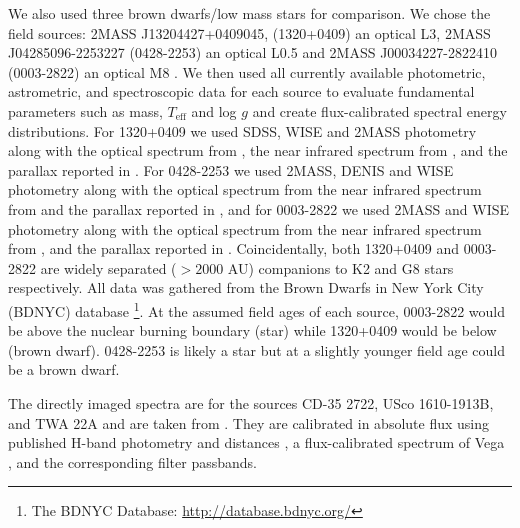 \documentclass[twocolumn]{aastex61}
\begin{document}
We also used three brown dwarfs/low mass stars for comparison. We chose the field sources: 2MASS J13204427+0409045, (1320+0409) an optical L3, 2MASS J04285096-2253227 (0428-2253) an optical L0.5 and 2MASS J00034227-2822410 (0003-2822) an optical M8 \citep[see][]{filippazzo15}.  We then used all currently available photometric, astrometric, and spectroscopic data for each source to evaluate fundamental parameters such as mass, $T_\mathrm{eff}$ and log $g$ \citep{filippazzo15, faherty16} and create flux-calibrated spectral energy distributions.  For 1320+0409 we used SDSS, WISE and 2MASS photometry along with the optical spectrum from \cite{reid08}, the near infrared spectrum from \cite{bardalez14}, and the parallax reported in \cite{2012ApJ...752...56F}. For 0428-2253 we used 2MASS, DENIS and WISE photometry along with the optical spectrum from \cite{2003A&A...403..929K} the near infrared spectrum from \cite{bardalez14} and the parallax reported in \cite{2014AJ....147...94D}, and for 0003-2822 we used 2MASS and WISE photometry along with the optical spectrum from \cite{2007AJ....133..439C} the near infrared spectrum from \cite{2018AJ....155...34C}, and the parallax reported in \cite{2010AJ....139..176F}.  Coincidentally, both 1320+0409 and 0003-2822 are widely separated ($> 2000$ AU) companions to K2 and G8 stars respectively.  All data was gathered from the Brown Dwarfs in New York City (BDNYC) database \citep{filippazzo15}\footnote{The BDNYC Database: \url{http://database.bdnyc.org/}}.  At the assumed field ages of each source, 0003-2822 would be above the nuclear burning boundary (star) while 1320+0409 would be below (brown dwarf).  0428-2253 is likely a star but at a slightly younger field age could be a brown dwarf.

The directly imaged spectra are for the sources CD-35 2722, USco 1610-1913B, and TWA 22A and are taken from \cite{wahhaj11, aller13, bonnefoy14}. They are calibrated in absolute flux using published H-band photometry \citep{wahhaj11, aller13, bonnefoy09} and distances \citep{gaia16, teixeira09}, a flux-calibrated spectrum of Vega \citep{1985A&A...151..399M, 1985IAUS..111..225H}, and the corresponding filter passbands.  
\end{document}
